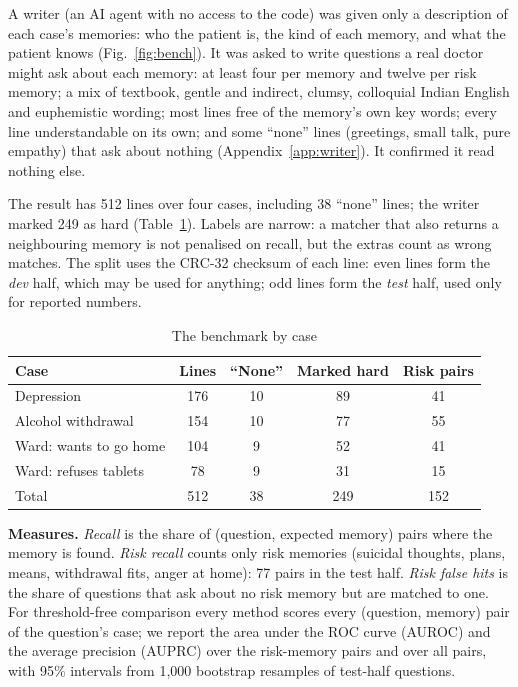 \documentclass[sn-mathphys-num]{sn-jnl}
\begin{document}
A writer (an AI agent with no access to the code) was given only a description of each case's memories: who the patient is, the kind of each
memory, and what the patient knows (Fig.~\ref{fig:bench}). It was asked to write questions a real doctor might ask about each memory: at least four
per memory and twelve per risk memory; a mix of textbook, gentle and indirect, clumsy, colloquial Indian English and euphemistic wording; most
lines free of the memory's own key words; every line understandable on its own; and some ``none'' lines (greetings, small talk, pure empathy)
that ask about nothing (Appendix~\ref{app:writer}). It confirmed it read nothing else.

The result has 512 lines over four cases, including 38 ``none'' lines; the writer marked 249 as hard (Table~\ref{tab:benchstats}). Labels are
narrow: a matcher that also returns a neighbouring memory is not penalised on recall, but the extras count as wrong matches. The split uses the
CRC-32 checksum of each line: even lines form the \emph{dev} half, which may be used for anything; odd lines form the \emph{test} half, used only
for reported numbers.

\begin{table}[t]
\caption{The benchmark by case}
\label{tab:benchstats}
\footnotesize
\begin{tabular*}{\linewidth}{@{\extracolsep{\fill}}lcccc@{}}
\toprule
Case & Lines & ``None'' & Marked hard & Risk pairs\\
\midrule
Depression & 176 & 10 & 89 & 41\\
Alcohol withdrawal & 154 & 10 & 77 & 55\\
Ward: wants to go home & 104 & 9 & 52 & 41\\
Ward: refuses tablets & 78 & 9 & 31 & 15\\
\midrule
Total & 512 & 38 & 249 & 152\\
\bottomrule
\end{tabular*}
\end{table}

\textbf{Measures.} \emph{Recall} is the share of (question, expected memory) pairs where the memory is found. \emph{Risk recall} counts only risk
memories (suicidal thoughts, plans, means, withdrawal fits, anger at home): 77 pairs in the test half. \emph{Risk false hits} is the share of
questions that ask about no risk memory but are matched to one. For threshold-free comparison every method scores every (question, memory)
pair of the question's case; we report the area under the ROC curve (AUROC) and the average precision (AUPRC) over the risk-memory pairs and over
all pairs, with 95\% intervals from 1,000 bootstrap resamples of test-half questions.
\end{document}

